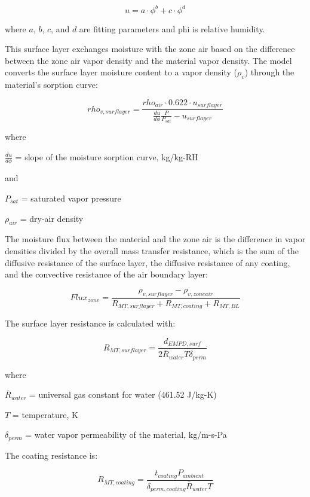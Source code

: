 \begin{equation}
u = a \cdot \phi^b + c \cdot \phi^d
\end{equation}

where $a$, $b$, $c$, and $d$ are fitting parameters and phi is relative humidity.

This surface layer exchanges moisture with the zone air based on the difference between the zone air vapor density and the material vapor density. The model converts the surface layer moisture content to a vapor density ($\rho_v$) through the material's sorption curve:

\begin{equation}
rho_{v,surflayer} = \frac {rho_{air} \cdot 0.622 \cdot u_{surflayer}} {\frac{du}{d\phi} \frac{P}{P_{sat}} - u_{surflayer}}
\end{equation}

where

$\frac{du}{d\phi}$ = slope of the moisture sorption curve, kg/kg-RH

and

$P_{sat}$ = saturated vapor pressure

$\rho_{air}$ = dry-air density

The moisture flux between the material and the zone air is the difference in vapor densities divided by the overall mass transfer resistance, which is the sum of the diffusive resistance of the surface layer, the diffusive resistance of any coating, and the convective resistance of the air boundary layer:

\begin{equation}
Flux_{zone} = \frac{\rho_{v,surflayer} - \rho_{v,zoneair}}{R_{MT,surflayer} + R_{MT,coating} + R_{MT,BL}}
\end{equation}

The surface layer resistance is calculated with:

\begin{equation}
R_{MT,surflayer} = \frac{d_{EMPD,surf}} {2 \bar R_{water} T \delta_{perm}}
\end{equation}

where

$\bar R_{water}$ = universal gas constant for water (461.52 J/kg-K)

$T$ = temperature, K

$\delta_{perm}$ = water vapor permeability of the material, kg/m-s-Pa

The coating resistance is:

\begin{equation}
R_{MT,coating} = \frac {t_{coating} P_{ambient}} {\delta_{perm,coating} \bar R_{water} T}
\end{equation}

